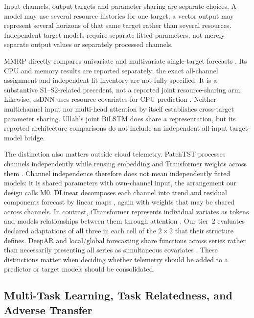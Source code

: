 \documentclass[a4paper,11pt]{article}
\begin{document}
Input channels, output targets and parameter sharing are separate choices.
A model may use several resource histories for one target; a vector output
may represent several horizons of that same target rather than several
resources. Independent target models require separate fitted parameters,
not merely separate output values or separately processed channels.

MMRP directly compares univariate and multivariate single-target forecasts
\citep{Tripathi2025MMRP}. Its CPU and memory results are reported separately;
the exact all-channel assignment and independent-fit inventory are not fully
specified. It is a substantive S1--S2-related precedent, not a reported joint
resource-sharing arm. Likewise, esDNN uses resource covariates for CPU
prediction \citep{Xu2022esDNN}. Neither multichannel input nor multi-head
attention by itself establishes cross-target parameter sharing. Ullah's joint
BiLSTM does share a representation, but its reported architecture comparisons
do not include an independent all-input target-model bridge.

The distinction also matters outside cloud telemetry. PatchTST processes
channels independently while reusing embedding and Transformer weights across
them \citep{Nie2023PatchTST}. Channel independence therefore does not mean
independently fitted models: it is shared parameters with own-channel input,
the arrangement our design calls M0. DLinear decomposes each channel into
trend and residual components forecast by linear maps \citep{Zeng2023DLinear},
again with weights that may be shared across channels. In contrast,
iTransformer represents individual variates as tokens and models
relationships between them through attention \citep{Liu2024iTransformer}.
Our tier~2 evaluates declared adaptations of all three in each
cell of the $2\times2$ that their structure defines.
DeepAR and local/global forecasting share functions across series rather than
necessarily presenting all series as simultaneous covariates
\citep{Salinas2020DeepAR,MonteroManso2021GlobalForecasting}.
These distinctions matter when deciding whether telemetry should be added to
a predictor or target models should be consolidated.

\subsection*{Multi-Task Learning, Task Relatedness, and Adverse Transfer}
\end{document}
